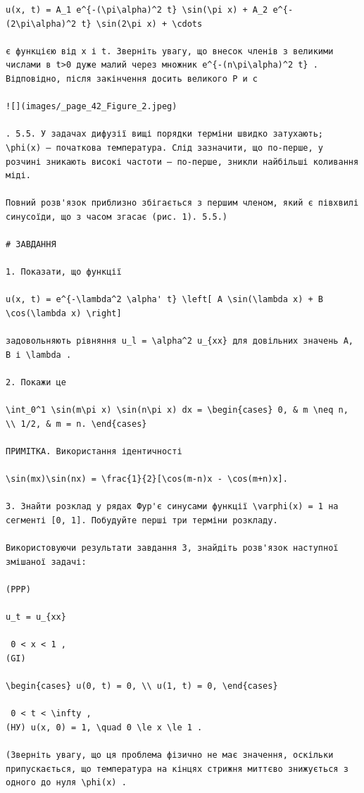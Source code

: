 \documentclass[
  ukrainian,
]{article}
\begin{document}
\begin{verbatim}
u(x, t) = A_1 e^{-(\pi\alpha)^2 t} \sin(\pi x) + A_2 e^{-(2\pi\alpha)^2 t} \sin(2\pi x) + \cdots

є функцією від x і t. Зверніть увагу, що внесок членів з великими числами в t>0 дуже малий через множник e^{-(n\pi\alpha)^2 t} . Відповідно, після закінчення досить великого Р и с

![](images/_page_42_Figure_2.jpeg)

. 5.5. У задачах дифузії вищі порядки терміни швидко затухають; \phi(x) — початкова температура. Слід зазначити, що по-перше, у розчині зникають високі частоти — по-перше, зникли найбільші коливання міді.

Повний розв'язок приблизно збігається з першим членом, який є півхвилі синусоїди, що з часом згасає (рис. 1). 5.5.)

# ЗАВДАННЯ

1. Показати, що функції

u(x, t) = e^{-\lambda^2 \alpha' t} \left[ A \sin(\lambda x) + B \cos(\lambda x) \right]

задовольняють рівняння u_l = \alpha^2 u_{xx} для довільних значень A, B і \lambda .

2. Покажи це

\int_0^1 \sin(m\pi x) \sin(n\pi x) dx = \begin{cases} 0, & m \neq n, \\ 1/2, & m = n. \end{cases}

ПРИМІТКА. Використання ідентичності

\sin(mx)\sin(nx) = \frac{1}{2}[\cos(m-n)x - \cos(m+n)x].

3. Знайти розклад у рядах Фур'є синусами функції \varphi(x) = 1 на сегменті [0, 1]. Побудуйте перші три терміни розкладу.

Використовуючи результати завдання 3, знайдіть розв'язок наступної змішаної задачі:

(PPP)

u_t = u_{xx}

 0 < x < 1 , 
(GI)

\begin{cases} u(0, t) = 0, \\ u(1, t) = 0, \end{cases}

 0 < t < \infty , 
(НУ) u(x, 0) = 1, \quad 0 \le x \le 1 .

(Зверніть увагу, що ця проблема фізично не має значення, оскільки припускається, що температура на кінцях стрижня миттєво знижується з одного до нуля \phi(x) .


\end{verbatim}
\end{document}
